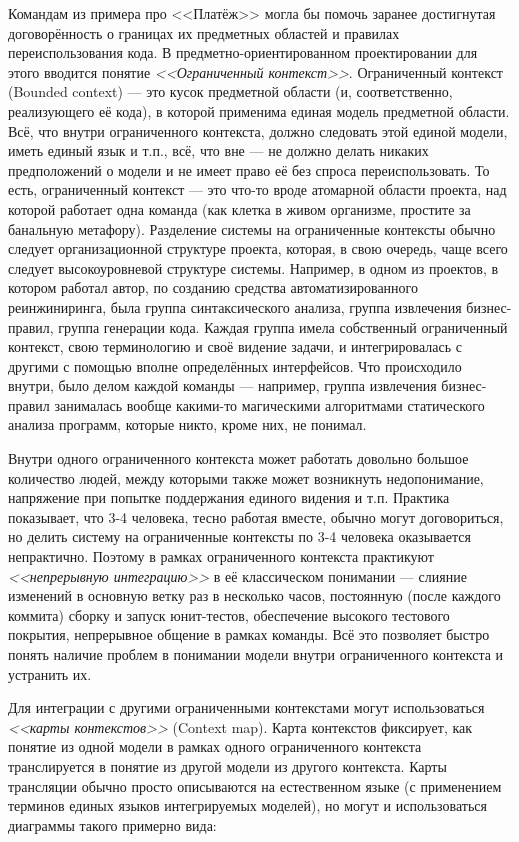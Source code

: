 \documentclass{../../text-style}
\begin{document}
Командам из примера про <<Платёж>> могла бы помочь заранее достигнутая договорённость о границах их предметных областей и правилах переиспользования кода. В предметно-ориентированном проектировании для этого вводится понятие \textit{<<Ограниченный контекст>>}. Ограниченный контекст (Bounded context) --- это кусок предметной области (и, соответственно, реализующего её кода), в которой применима единая модель предметной области. Всё, что внутри ограниченного контекста, должно следовать этой единой модели, иметь единый язык и т.п., всё, что вне --- не должно делать никаких предположений о модели и не имеет право её без спроса переиспользовать. То есть, ограниченный контекст --- это что-то вроде атомарной области проекта, над которой работает одна команда (как клетка в живом организме, простите за банальную метафору). Разделение системы на ограниченные контексты обычно следует организационной структуре проекта, которая, в свою очередь, чаще всего следует высокоуровневой структуре системы. Например, в одном из проектов, в котором работал автор, по созданию средства автоматизированного реинжиниринга, была группа синтаксического анализа, группа извлечения бизнес-правил, группа генерации кода. Каждая группа имела собственный ограниченный контекст, свою терминологию и своё видение задачи, и интегрировалась с другими с помощью вполне определённых интерфейсов. Что происходило внутри, было делом каждой команды --- например, группа извлечения бизнес-правил занималась вообще какими-то магическими алгоритмами статического анализа программ, которые никто, кроме них, не понимал.

Внутри одного ограниченного контекста может работать довольно большое количество людей, между которыми также может возникнуть недопонимание, напряжение при попытке поддержания единого видения и т.п. Практика показывает, что 3-4 человека, тесно работая вместе, обычно могут договориться, но делить систему на ограниченные контексты по 3-4 человека оказывается непрактично. Поэтому в рамках ограниченного контекста практикуют \textit{<<непрерывную интеграцию>>} в её классическом понимании --- слияние изменений в основную ветку раз в несколько часов, постоянную (после каждого коммита) сборку и запуск юнит-тестов, обеспечение высокого тестового покрытия, непрерывное общение в рамках команды. Всё это позволяет быстро понять наличие проблем в понимании модели внутри ограниченного контекста и устранить их.

Для интеграции с другими ограниченными контекстами могут использоваться \textit{<<карты контекстов>>} (Context map). Карта контекстов фиксирует, как понятие из одной модели в рамках одного ограниченного контекста транслируется в понятие из другой модели из другого контекста. Карты трансляции обычно просто описываются на естественном языке (с применением терминов единых языков интегрируемых моделей), но могут и использоваться диаграммы такого примерно вида:
\end{document}
